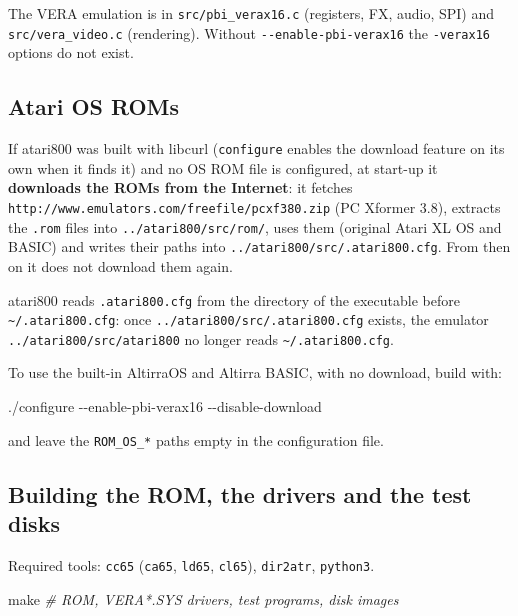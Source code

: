 \documentclass[
]{article}
\newenvironment{Shaded}{}{}
\newcommand{\AttributeTok}[1]{\textcolor[rgb]{0.49,0.56,0.16}{#1}}
\newcommand{\CommentTok}[1]{\textcolor[rgb]{0.38,0.63,0.69}{\textit{#1}}}
\newcommand{\ExtensionTok}[1]{#1}
\newcommand{\FunctionTok}[1]{\textcolor[rgb]{0.02,0.16,0.49}{#1}}
\begin{document}
The VERA emulation is in \texttt{src/pbi\_verax16.c} (registers, FX,
audio, SPI) and \texttt{src/vera\_video.c} (rendering). Without
\texttt{-\/-enable-pbi-verax16} the \texttt{-verax16} options do not
exist.

\subsection{Atari OS ROMs}\label{atari-os-roms}

If atari800 was built with libcurl (\texttt{configure} enables the
download feature on its own when it finds it) and no OS ROM file is
configured, at start-up it \textbf{downloads the ROMs from the
Internet}: it fetches
\texttt{http://www.emulators.com/freefile/pcxf380.zip} (PC Xformer 3.8),
extracts the \texttt{.rom} files into \texttt{../atari800/src/rom/},
uses them (original Atari XL OS and BASIC) and writes their paths into
\texttt{../atari800/src/.atari800.cfg}. From then on it does not
download them again.

atari800 reads \texttt{.atari800.cfg} from the directory of the
executable before \texttt{\textasciitilde{}/.atari800.cfg}: once
\texttt{../atari800/src/.atari800.cfg} exists, the emulator
\texttt{../atari800/src/atari800} no longer reads
\texttt{\textasciitilde{}/.atari800.cfg}.

To use the built-in AltirraOS and Altirra BASIC, with no download, build
with:

\begin{Shaded}
\begin{Highlighting}[]
\ExtensionTok{./configure} \AttributeTok{{-}{-}enable{-}pbi{-}verax16} \AttributeTok{{-}{-}disable{-}download}
\end{Highlighting}
\end{Shaded}

and leave the \texttt{ROM\_OS\_*} paths empty in the configuration file.

\subsection{Building the ROM, the drivers and the test
disks}\label{building-the-rom-the-drivers-and-the-test-disks}

Required tools: \texttt{cc65} (\texttt{ca65}, \texttt{ld65},
\texttt{cl65}), \texttt{dir2atr}, \texttt{python3}.

\begin{Shaded}
\begin{Highlighting}[]
\FunctionTok{make}            \CommentTok{\# ROM, VERA*.SYS drivers, test programs, disk images}
\end{Highlighting}
\end{Shaded}
\end{document}
